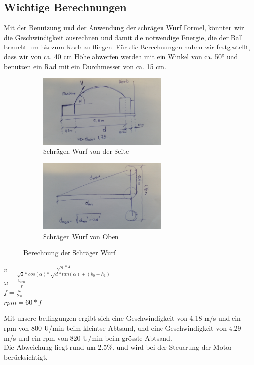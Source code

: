 \subsection{Wichtige Berechnungen}
Mit der Benutzung und der Anwendung der schrägen Wurf Formel, könnten wir die Geschwindigkeit ausrechnen und damit die notwendige Energie, 
die der Ball braucht um bis zum Korb zu fliegen. Für die Berechnungen haben wir festgestellt, dass wir von ca. 40 cm Höhe abwerfen werden 
mit ein Winkel von ca. 50° und benutzen ein Rad mit ein Durchmesser von ca. 15 cm. \\

\begin{figure}
	\centering
	\begin{subfigure}{.5\textwidth}
		\centering
		\includegraphics[width=0.7\textwidth]{../../fig/Skizze_Berechnung_1.jpg}
		\caption{Schrägen Wurf von der Seite}
		\label{fig:Berechnungen von die Geschwindigkeit}
	\end{subfigure} %
	\begin{subfigure}{.5\textwidth}
		\centering
		\includegraphics[width=0.7\textwidth]{../../fig/Skizze_Berechnung_2.jpg}
		\caption{Schrägen Wurf von Oben}
		\label{fig:Berechnungen von die Geschwindigkeit}
	\end{subfigure}
	\caption{Berechnung der Schräger Wurf}
	\label{Berechnungen}
\end{figure}
\begin{center}
$v=\frac{\sqrt{g}*d}{\sqrt{2}*cos(\alpha)*\sqrt{d*tan(\alpha)+(h_0-h_1)}}$ \\
$\omega=\frac{v_{tan}}{r}$ \\
$f=\frac{\omega}{2\pi}$ \\
$rpm=60*f$
\end{center}

Mit unsere bedingungen ergibt sich eine Geschwindigkeit von 4.18 m/s und ein rpm von 800 U/min beim kleintse Abtsand, 
und eine Geschwindigkeit von 4.29 m/s und ein rpm von 820 U/min beim grösste Abtsand. \\
Die Abweichung liegt rund um 2.5\%, und wird bei der Steuerung der Motor berücksichtigt.


